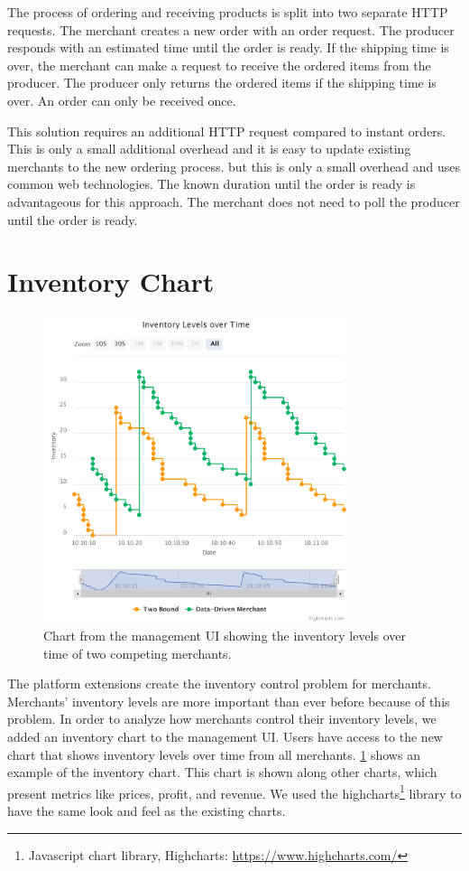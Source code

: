 The process of ordering and receiving products is split into two separate HTTP requests.
The merchant creates a new order with an order request.
The producer responds with an estimated time until the order is ready.
If the shipping time is over, the merchant can make a request to receive the ordered items from the producer.
The producer only returns the ordered items if the shipping time is over.
An order can only be received once.

This solution requires an additional HTTP request compared to instant orders.
This is only a small additional overhead and it is easy to update existing merchants to the new ordering process.
but this is only a small overhead and uses common web technologies.
The known duration until the order is ready is advantageous for this approach.
The merchant does not need to poll the producer until the order is ready.

\section{Inventory Chart}
\label{section:inventory_graph}

\begin{figure}[t]
	\centering
	\includegraphics[width=0.8\textwidth]{figures/inventory_graph}
	\caption{Chart from the management UI showing the inventory levels over time of two competing merchants.}
	\label{fig:invnetory_graph}
\end{figure}

The platform extensions create the inventory control problem for merchants.
Merchants' inventory levels are more important than ever before because of this problem.
In order to analyze how merchants control their inventory levels, we added an inventory chart to the management UI.
Users have access to the new chart that shows inventory levels over time from all merchants.
\cref{fig:invnetory_graph} shows an example of the inventory chart.
This chart is shown along other charts, which present metrics like prices, profit, and revenue. 
We used the highcharts\footnote{Javascript chart library, Highcharts: \url{https://www.highcharts.com/}} library to have the same look and feel as the existing charts.

